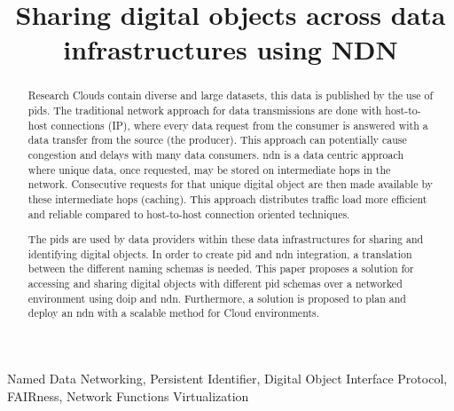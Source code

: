 \documentclass[conference]{IEEEtran}
\begin{document}
\title{Sharing digital objects across data infrastructures using NDN
}

\author{

}

\maketitle

\begin{abstract}
Research Clouds contain diverse and large datasets, this data is published by the use of \glspl{pid}. The traditional network approach for data transmissions are done with host-to-host connections (IP), where every data request from the consumer is answered with a data transfer from the source (the producer). This approach can potentially cause congestion and delays with many data consumers. \gls{ndn} is a data centric approach where unique data, once requested, may be stored on intermediate hops in the network. Consecutive requests for that unique digital object are then made available by these intermediate hops (caching). This approach distributes traffic load more efficient and reliable compared to host-to-host connection oriented techniques.

The \glspl{pid} are used by data providers within these data infrastructures for sharing and identifying digital objects. In order to create \gls{pid} and \gls{ndn} integration, a translation between the different naming schemas is needed. This paper proposes a solution for accessing and sharing digital objects with different \gls{pid} schemas over a networked environment using \gls{doip} and \gls{ndn}. Furthermore, a solution is proposed to plan and deploy an \gls{ndn} with a scalable method for Cloud environments.



\end{abstract}

\begin{IEEEkeywords}
Named Data Networking, Persistent Identifier, Digital Object Interface Protocol, FAIRness, Network Functions Virtualization
\end{IEEEkeywords}
\end{document}
